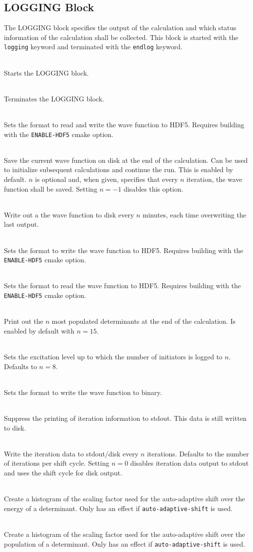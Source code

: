 \documentclass[a4paper,notitlepage,dvipsnames]{scrreprt}
\newcommand\codeitem[1]{\needspace{1.5\baselineskip}\item[\textnormal{\ttfamily #1 \nopagebreak}] \hfill \\ \nopagebreak}
\let\code\lstinline
\begin{document}
    \subsection{LOGGING Block}
    The LOGGING block specifies the output of the calculation and which
    status information of the calculation shall be collected. This block is
    started with the \texttt{logging} keyword and terminated with the
    \texttt{endlog} keyword.
    \begin{description}
      \codeitem{\textcolor{oblue}{logging}}
      Starts the LOGGING block.
      \codeitem{\textcolor{oblue}{endlog}}
      Terminates the LOGGING block.
      \codeitem{\textcolor{oblue}{hdf5-popsfile}}
      Sets the format to read and write the wave function to HDF5. Requires building
      with the \texttt{ENABLE-HDF5} cmake option.
      \codeitem{popsfile $n$}
      Save the current wave function on disk at the end of the
      calculation. Can be used to initialize subsequent calculations and
      continue the run. This is enabled by default. $n$ is optional and, when
      given, specifies that every $n$ iteration, the wave function shall be
      saved. Setting $n=-1$ disables this option.
      \codeitem{popsFileTimer $n$}
      Write out a the wave function to disk every $n$ minutes, each time
      overwriting the last output.
      \codeitem{hdf5-pops-write}
      Sets the format to write the wave function to HDF5. Requires building
      with the \texttt{ENABLE-HDF5} cmake option.
      \codeitem{hdf5-pops-read}
      Sets the format to read the wave function to HDF5. Requires building
      with the \texttt{ENABLE-HDF5} cmake option. 
      \codeitem{highlyPopWrite $n$}
      Print out the $n$ most populated determinants at the end of the
      calculation. Is enabled by default with $n=15$.
      \codeitem{inits-exlvl-write $n$}
      Sets the excitation level up to which the number of initiators is logged
      to $n$. Defaults to $n=8$.
      \codeitem{binarypops}
      Sets the format to write the wave function to binary.
      \codeitem{nomcoutput}
      Suppress the printing of iteration information to stdout. This data is
      still written to disk.
      \codeitem{stepsOutput $n$}
      Write the iteration data to stdout/disk every $n$ iterations. Defaults
      to the number of iterations per shift cycle. Setting $n=0$ disables
      iteration data output to stdout and uses the shift cycle for disk
      output.
      \codeitem{fval-energy-hist}
      Create a histogram of the scaling factor used for the auto-adaptive shift
      over the energy of a determinant. Only has an effect if
      \code{auto-adaptive-shift} is used.
      \codeitem{fval-pops-hist}
      Create a histogram of the scaling factor used for the auto-adaptive shift
      over the population of a determinant. Only has an effect if
      \code{auto-adaptive-shift} is used.
    \end{description}
\end{document}
